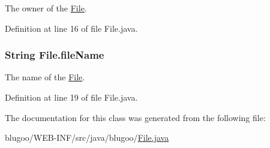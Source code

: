 The owner of the \hyperlink{classFile}{File}. 



Definition at line 16 of file File.java.\hypertarget{classFile_2bf051a55e4713614282ec0d23137147}{
\subsubsection{\setlength{\rightskip}{0pt plus 5cm}String {\bf File.fileName}}}
\label{classFile_2bf051a55e4713614282ec0d23137147}


The name of the \hyperlink{classFile}{File}. 



Definition at line 19 of file File.java.

The documentation for this class was generated from the following file:\begin{CompactItemize}
\item 
blugoo/WEB-INF/src/java/blugoo/\hyperlink{File_8java}{File.java}\end{CompactItemize}
